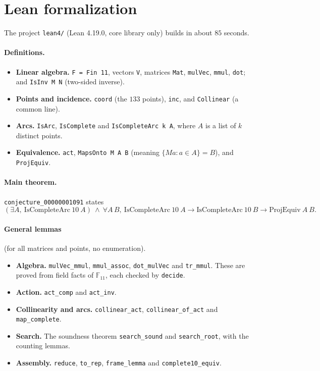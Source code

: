 \documentclass[11pt]{article}
\theoremstyle{definition}
\theoremstyle{remark}
\newcommand{\F}{\mathbb{F}_{11}}
\begin{document}
\section{Lean formalization}
The project \texttt{lean4/} (Lean 4.19.0, core library only) builds in about
$85$ seconds.

\paragraph{Definitions.}
\begin{itemize}
\item \textbf{Linear algebra.} \texttt{F = Fin 11}, vectors \texttt{V},
matrices \texttt{Mat}, \texttt{mulVec}, \texttt{mmul}, \texttt{dot}; and
\texttt{IsInv M N} (two-sided inverse).
\item \textbf{Points and incidence.} \texttt{coord} (the $133$ points),
\texttt{inc}, and \texttt{Collinear} (a common line).
\item \textbf{Arcs.} \texttt{IsArc}, \texttt{IsComplete} and
\texttt{IsCompleteArc k A}, where $A$ is a list of $k$ distinct points.
\item \textbf{Equivalence.} \texttt{act}, \texttt{MapsOnto M A B} (meaning
$\{Ma : a\in A\}=B$), and \texttt{ProjEquiv}.
\end{itemize}

\paragraph{Main theorem.}
\texttt{conjecture\_00000001091} states
\[
(\exists A,\ \mathrm{IsCompleteArc}\ 10\ A)\ \wedge\ \forall A\,B,\
\mathrm{IsCompleteArc}\ 10\ A\to\mathrm{IsCompleteArc}\ 10\ B\to
\mathrm{ProjEquiv}\ A\ B.
\]

\paragraph{General lemmas} (for all matrices and points, no enumeration).
\begin{itemize}
\item \textbf{Algebra.} \texttt{mulVec\_mmul}, \texttt{mmul\_assoc},
\texttt{dot\_mulVec} and \texttt{tr\_mmul}. These are proved from field facts
of $\F$, each checked by \texttt{decide}.
\item \textbf{Action.} \texttt{act\_comp} and \texttt{act\_inv}.
\item \textbf{Collinearity and arcs.} \texttt{collinear\_act},
\texttt{collinear\_of\_act} and \texttt{map\_complete}.
\item \textbf{Search.} The soundness theorem \texttt{search\_sound} and
\texttt{search\_root}, with the counting lemmas.
\item \textbf{Assembly.} \texttt{reduce}, \texttt{to\_rep},
\texttt{frame\_lemma} and \texttt{complete10\_equiv}.
\end{itemize}
\end{document}
